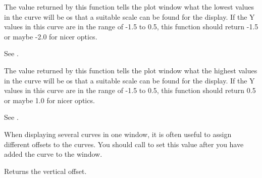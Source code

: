 \label{wxplotcurvesetstarty}


The value returned by this function tells the plot window what the lowest values
in the curve will be os that a suitable scale can be found for the display. If
the Y values in this curve are in the range of -1.5 to 0.5, this function should
return -1.5 or maybe -2.0 for nicer optics.

\label{wxplotcurvegetstarty}


See .

\label{wxplotcurvesetendy}


The value returned by this function tells the plot window what the highest values
in the curve will be os that a suitable scale can be found for the display. If
the Y values in this curve are in the range of -1.5 to 0.5, this function should
return 0.5 or maybe 1.0 for nicer optics.

\label{wxplotcurvegetendy}


See .

\label{wxplotcurvesetoffsety}


When displaying several curves in one window, it is often useful to assign
different offsets to the curves. You should call 
to set this value after you have added the curve to the window.

\label{wxplotcurvegetoffsety}


Returns the vertical offset.
